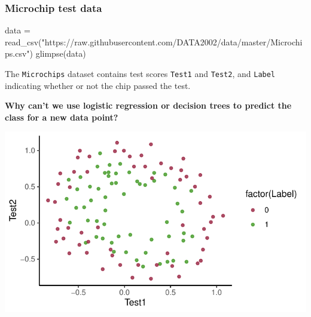 \documentclass[a4paper]{article}\usepackage[]{graphicx}\usepackage[]{xcolor}
\makeatletter
\def\maxwidth{ %
  \ifdim\Gin@nat@width>\linewidth
    \linewidth
  \else
    \Gin@nat@width
  \fi
}
\makeatother
\begin{document}
\subsubsection{Microchip test data}
\begin{Schunk}
\begin{Sinput}
data = read_csv("https://raw.githubusercontent.com/DATA2002/data/master/Microchips.csv")
glimpse(data)
\end{Sinput}
\end{Schunk}
The \lstinline|Microchips| dataset contains test scores \lstinline|Test1| and \lstinline|Test2|, and \lstinline|Label| indicating whether or not the chip passed the test.
\begin{greenbox}
	\textbf{Why can't we use logistic regression or decision trees to predict the class for a new data point?}
\end{greenbox}
\begin{Schunk}


{\centering \includegraphics[width=\maxwidth]{figure/listings-unnamed-chunk-451-1} 

}

\end{Schunk}
\end{document}
